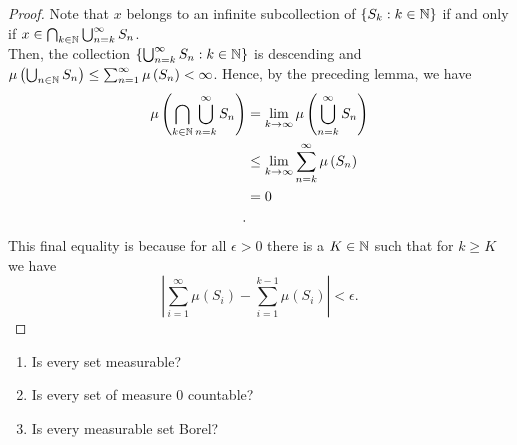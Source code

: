 \begin{proof}
	Note that \(x\) belongs to an infinite subcollection of \(\{S_{k} : k \in \mathbb{N}\} \) if and only if \(x \in \bigcap_{k \in \mathbb{N}} \bigcup_{n = k} ^{\infty} S_{n}\).\\
	Then, the collection \(\{\bigcup_{n=k} ^{\infty}S_{n} : k \in \mathbb{N}\} \) is descending and  \( \mu\left( \bigcup_{n \in \mathbb{N}} S_{n} \right) \le \sum_{n=1}^{\infty} \mu\left( S_{n} \right) < \infty\). Hence, by the preceding lemma, we have
	\begin{align*}
		\mu\left( \bigcap_{k \in \N} \bigcup_{ n = k} ^{\infty}S_{n} \right) &= \lim_{k \to \infty} \mu\left( \bigcup_{n=k} ^{\infty} S _{n}\right)  \\
										     &\le \lim_{k \to \infty}\sum_{n = k}^{\infty} \mu\left( S_{n} \right)\\
										     &=  0 \\
	.\end{align*}
	This final equality is because for all \(\epsilon > 0\) there is a \(K \in \mathbb{N}\) such that for \(k \ge K\) we have \[
		\left| \sum_{i= 1}^{\infty} \mu\left( S_{i} \right) - \sum_{i= 1}^{k-1} \mu\left( S_{i} \right)  \right| < \epsilon
	.\]
\end{proof}
\begin{problem}
	\begin{enumerate}
		\item Is every set measurable?
		\item Is every set of measure \(0\) countable?
		\item Is every measurable set Borel?
	\end{enumerate}
\end{problem}
